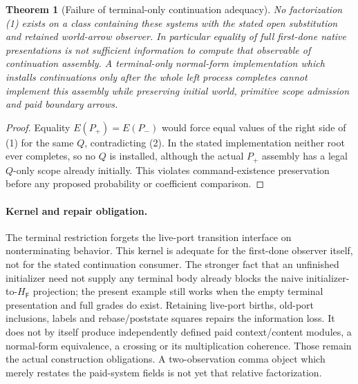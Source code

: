 \documentclass[11pt]{article}\usepackage{amsmath,amssymb,amsthm,geometry}\geometry{margin=1in}
\newtheorem{theorem}{Theorem}
\begin{document}
\begin{theorem}[Failure of terminal-only continuation adequacy]
No factorization (1) exists on a class containing these systems with the stated open substitution and retained world-arrow observer. In particular equality of full first-done native presentations is not sufficient information to compute that observable of continuation assembly. A terminal-only normal-form implementation which installs continuations only after the whole left process completes cannot implement this assembly while preserving initial world, primitive scope admission and paid boundary arrows.
\end{theorem}
\begin{proof}
Equality $E(P_+)=E(P_-)$ would force equal values of the right side of (1) for the same $Q$, contradicting (2). In the stated implementation neither root ever completes, so no $Q$ is installed, although the actual $P_+$ assembly has a legal $Q$-only scope already initially. This violates command-existence preservation before any proposed probability or coefficient comparison.\end{proof}

\paragraph{Kernel and repair obligation.} The terminal restriction forgets the live-port transition interface on nonterminating behavior. This kernel is adequate for the first-done observer itself, not for the stated continuation consumer. The stronger fact that an unfinished initializer need not supply any terminal body already blocks the naive initializer-to-$H_{\mathsf F}$ projection; the present example still works when the empty terminal presentation and full grades do exist. Retaining live-port births, old-port inclusions, labels and rebase/poststate squares repairs the information loss. It does not by itself produce independently defined paid context/content modules, a normal-form equivalence, a crossing or its multiplication coherence. Those remain the actual construction obligations. A two-observation comma object which merely restates the paid-system fields is not yet that relative factorization.
\end{document}
